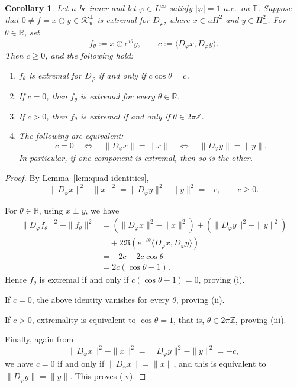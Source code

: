 \documentclass[12pt]{amsart}
\newtheorem{corollary}[theorem]{Corollary}
\theoremstyle{definition}
\theoremstyle{remark}
\def \R{\mathbb{R}}
\def \Z{\mathbb{Z}}
\def \T{\mathbb{T}}
\newcommand{\clk}{\mathcal{K}}
\newcommand{\vp}{\varphi}
\numberwithin{equation}{section}
\begin{document}
\begin{corollary}\label{cor:zeroMixedTerm}
Let $u$ be inner and let $\vp\in L^\infty$ satisfy $|\vp|=1$ a.e.\ on $\T$. Suppose that $0\neq f=x\oplus y\in\clk_u^\perp$ is extremal for $D_\vp$, where $x\in uH^2$ and $y\in H^2_{-}$. For $\theta\in\R$, set
\[
f_\theta:=x\oplus e^{i\theta}y, \qquad
c:=\langle D_\vp x,D_\vp y\rangle.
\]
Then $c\geq0$, and the following hold:
\begin{enumerate}
\item $f_\theta$ is extremal for $D_\vp$ if and only if $c\cos\theta=c$.
		
\item If $c=0$, then $f_\theta$ is extremal for every $\theta\in\R$.
		
\item If $c>0$, then $f_\theta$ is extremal if and only if $\theta\in2\pi\Z$.
		
\item The following are equivalent:
\[
c=0
\quad\Longleftrightarrow\quad\|D_\vp x\|=\|x\|\quad\Longleftrightarrow\quad\|D_\vp y\|=\|y\|.
\]
In particular, if one component is extremal, then so is the other.
\end{enumerate}
\end{corollary}

\begin{proof}
By Lemma~\ref{lem:quad-identities},
\[
\|D_\vp x\|^2-\|x\|^2=\|D_\vp y\|^2-\|y\|^2=-c,\qquad c\geq0.
\]
	
For $\theta\in\R$, using $x\perp y$, we have
\[
\begin{aligned}
\|D_\vp f_\theta\|^2-\|f_\theta\|^2
&=\left(\|D_\vp x\|^2-\|x\|^2\right)+\left(\|D_\vp y\|^2-\|y\|^2\right) \\
&\quad
+2\Re\left(e^{-i\theta}\langle D_\vp x,D_\vp y\rangle\right) \\
&=-2c+2c\cos\theta \\
&=2c(\cos\theta-1).
\end{aligned}
\]
Hence $f_\theta$ is extremal if and only if $c(\cos\theta-1)=0$, proving \textup{(i)}.
	
If $c=0$, the above identity vanishes for every $\theta$, proving
\textup{(ii)}. 

If $c>0$, extremality is equivalent to $\cos\theta=1$, that is, $\theta\in2\pi\Z$, proving \textup{(iii)}.
	
Finally, again from
\[
\|D_\vp x\|^2-\|x\|^2=\|D_\vp y\|^2-\|y\|^2=-c,
\]
we have $c=0$ if and only if $\|D_\vp x\|=\|x\|$, and this is equivalent to $\|D_\vp y\|=\|y\|$. This proves \textup{(iv)}.
\end{proof}
\end{document}
